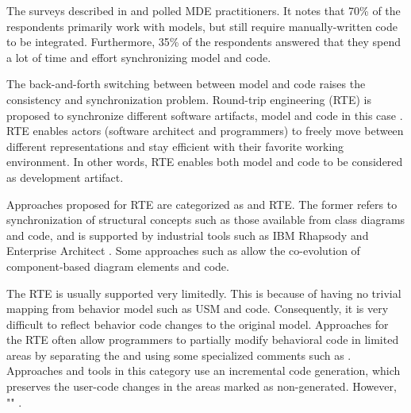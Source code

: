 The surveys described in \cite{Hutchinson:2011:MEP:1985793.1985882} and \cite{Hutchinson:2011:EAM:1985793.1985858} polled MDE practitioners. 
It notes that 70\% of the respondents primarily work
with models, but still require manually-written code to be integrated.
Furthermore, 35\% of
the respondents answered that they spend a lot of time and effort synchronizing
model and code.


The back-and-forth switching between between model and code raises the consistency and synchronization problem.
Round-trip engineering (RTE) \cite{Hettel2008} is proposed to synchronize different software artifacts, model and code in this case \cite{Sendall}. 
RTE enables actors (software architect and programmers) to freely move between different representations and stay efficient with their favorite working environment. 
In other words, RTE enables both model and code to be considered as development artifact. 


Approaches proposed for RTE are categorized as  and  RTE.
The former refers to synchronization of structural concepts such as those available from class diagrams and code, and is supported by industrial tools such as IBM Rhapsody \cite{ibm_rhapsody} and Enterprise Architect \cite{sparxsystems_enterprise_2014}.
Some approaches such as \cite{langhammer2013co, kramer2015change} allow the co-evolution of component-based diagram elements and code.

The  RTE is usually supported very limitedly. 
This is because of having no trivial mapping from behavior model such as USM and code.
Consequently, it is very difficult to reflect behavior code changes to the original model.
Approaches for the  RTE often allow programmers to partially modify behavioral code in limited areas by separating the  and  \cite{ibm_rhapsody,steinberg2008emf} using some specialized comments such as .
Approaches and tools in this category use an incremental code generation, which preserves the user-code changes in the areas marked as non-generated.
However, "" \cite{zheng2012enhancing}.

